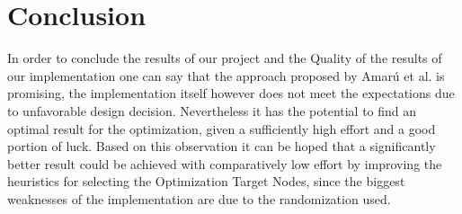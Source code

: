 \documentclass[
	accentcolor=1c,%
	type=intern,
	marginpar=false,
	ruledheaders=section,
	class=report,
	BCOR=5mm,
      parskip=half-,
	fontsize=10pt
	]{tudapub}
\begin{document}
{	\section{Conclusion}
	In order to conclude the results of our project and the Quality of the results of our implementation one can say that the approach proposed by Amarú et al. is promising, the implementation itself however does not meet the expectations due to unfavorable design decision.
	Nevertheless it has the potential to find an optimal result for the optimization, given a sufficiently high effort and a good portion of luck.
	Based on this observation it can be hoped that a significantly better result could be achieved with comparatively low effort by improving the heuristics for selecting the Optimization Target Nodes, since the biggest weaknesses of the implementation are due to the randomization used.
}
\end{document}
